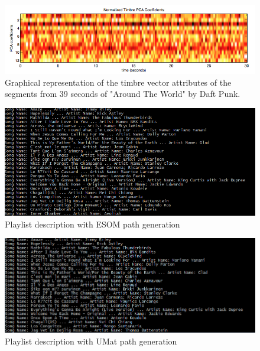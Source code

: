 \begin{figure}[h]
    \centering
    \includegraphics[width=\textwidth]{figures/timbre.jpg}
    \caption{Graphical representation of the timbre vector attributes of the segments from 39 seconds of "Around The World" by Daft Punk.}
    \label{fig:timbre}
\end{figure}


\begin{figure}[h]
    \centering
    \includegraphics[width=\textwidth]{figures/ESOMSongs.PNG}
    \caption{Playlist description with ESOM path generation}
    \label{fig:esomres}
\end{figure}

\begin{figure}[h]
    \centering
    \includegraphics[width=\textwidth]{figures/UMatSongs.PNG}
    \caption{Playlist description with UMat path generation}
    \label{fig:umatres}
\end{figure}


